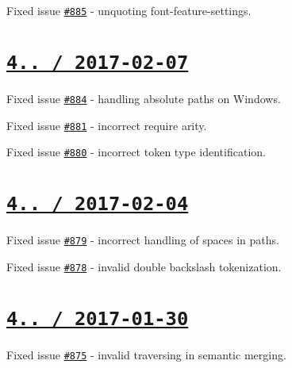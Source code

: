 \begin{DoxyItemize}
\item Fixed issue \href{https://github.com/jakubpawlowicz/clean-css/issues/885}{\tt \#885} -\/ unquoting {\ttfamily font-\/feature-\/settings}.
\end{DoxyItemize}

\section*{\href{https://github.com/jakubpawlowicz/clean-css/compare/v4.0.4...v4.0.5}{\tt 4.. / 2017-\/02-\/07} }


\begin{DoxyItemize}
\item Fixed issue \href{https://github.com/jakubpawlowicz/clean-css/issues/884}{\tt \#884} -\/ handling absolute paths on Windows.
\item Fixed issue \href{https://github.com/jakubpawlowicz/clean-css/issues/881}{\tt \#881} -\/ incorrect {\ttfamily require} arity.
\item Fixed issue \href{https://github.com/jakubpawlowicz/clean-css/issues/880}{\tt \#880} -\/ incorrect token type identification.
\end{DoxyItemize}

\section*{\href{https://github.com/jakubpawlowicz/clean-css/compare/v4.0.3...v4.0.4}{\tt 4.. / 2017-\/02-\/04} }


\begin{DoxyItemize}
\item Fixed issue \href{https://github.com/jakubpawlowicz/clean-css/issues/879}{\tt \#879} -\/ incorrect handling of spaces in paths.
\item Fixed issue \href{https://github.com/jakubpawlowicz/clean-css/issues/878}{\tt \#878} -\/ invalid double backslash tokenization.
\end{DoxyItemize}

\section*{\href{https://github.com/jakubpawlowicz/clean-css/compare/v4.0.2...v4.0.3}{\tt 4.. / 2017-\/01-\/30} }


\begin{DoxyItemize}
\item Fixed issue \href{https://github.com/jakubpawlowicz/clean-css/issues/875}{\tt \#875} -\/ invalid traversing in semantic merging.
\end{DoxyItemize}


